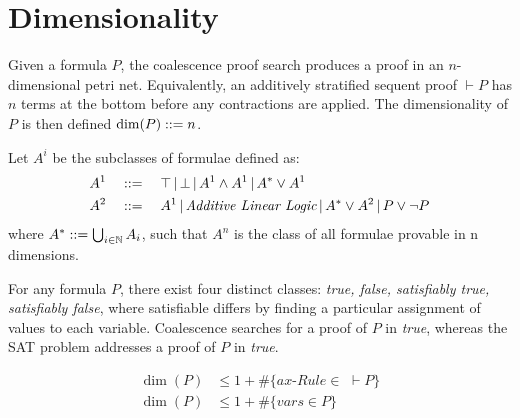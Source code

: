 \section{Dimensionality}
    
    \begin{definition*}[Dimensionality]
        Given a formula $P$, the coalescence proof search produces a proof in an $n$-dimensional petri net.
        Equivalently, an additively stratified sequent proof $\vdash P$ has $n$ terms at the bottom before any contractions are applied.
        The dimensionality of $P$ is then defined $\dim(P) ::= n$.
    \end{definition*}

    \begin{example}
    \end{example}


    \begin{definition*}
        Let $A^i$ be the subclasses of formulae defined as:
        \begin{align*}
            A^1 \quad &::= \quad \top \,|\, \bot \,|\, A^1 \wedge A^1 \,|\, A^* \vee A^1 \\
            A^2 \quad &::= \quad A^1 \,|\, \textit{Additive Linear Logic} \,|\, A^* \vee A^2 \,|\, P \vee \neg P
        \end{align*}
        where $A^* ::= \bigcup_{i \in \mathbb{N}} A_i$, such that $A^n$ is the class of all formulae provable in n dimensions.
    \end{definition*}


    \begin{remark*}
        For any formula $P$, there exist four distinct classes: \textit{true, false, satisfiably true, satisfiably false}, where satisfiable differs by finding a particular assignment of values to each variable.
        Coalescence searches for a proof of $P$ in \textit{true}, whereas the SAT problem addresses a proof of $P$ in \textit{true}.
    \end{remark*}
    
    
    \begin{proposition*}
        \begin{align*}
            \dim(P) &\leq 1 + \#\{ax\textit{-Rule} \in \,\, \vdash P\} \\
            \dim(P) &\leq 1 + \#\{vars \in P\}
        \end{align*}
    \end{proposition*}


